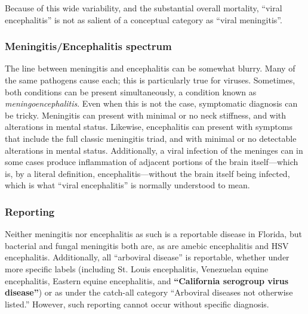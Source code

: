 \documentclass[12pt]{article}
\newcommand{\eg}{\textit{e.g.}}
\newcommand{\cjh}{\textcolor{blue}{cjh}}
\newcommand{\tjh}{\textcolor{red}{tjh}}
\newcommand{\msg}[3]{(#1 $\rightarrow$ #2: #3)}
\newcommand{\mct}[1]{\msg\cjh\tjh{#1}}
\begin{document}
            Because of this wide variability, and the substantial overall mortality, ``viral encephalitis'' is not as salient of a conceptual category as ``viral meningitis''.

        \subsubsection{Meningitis/Encephalitis spectrum}
            \label{spectrum}
            The line between meningitis and encephalitis can be somewhat blurry. Many of the same pathogens cause each; this is particularly true for viruses. Sometimes, both conditions can be present simultaneously, a condition known as \textit{meningoencephalitis}. Even when this is not the case, symptomatic diagnosis can be tricky. Meningitis can present with minimal or no neck stiffness, and with alterations in mental status. Likewise, encephalitis can present with symptoms that include the full classic meningitis triad, and with minimal or no detectable alterations in mental status. Additionally, a viral infection of the meninges can in some cases produce inflammation of adjacent portions of the brain itself---which is, by a literal definition, encephalitis---without the brain itself being infected, which is what ``viral encephalitis'' is normally understood to mean\cite{ropper2014adams}.
        
        \subsubsection{Reporting}
            \label{reporting}
            Neither meningitis nor encephalitis as such is a reportable disease in Florida, but bacterial and fungal meningitis both are, as are amebic encephalitis and HSV encephalitis. Additionally, all ``arboviral disease'' is reportable, whether under more specific labels (including St. Louis encephalitis, Venezuelan equine encephalitis, Eastern equine encephalitis, and \textbf{``California serogroup virus disease''}) or as under the catch-all category ``Arboviral diseases not otherwise listed.''\cite{florida2016reportable} However, such reporting cannot occur without specific diagnosis.

\end{document}
